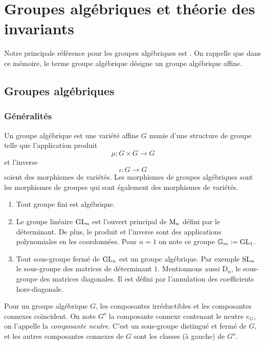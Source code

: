 \chapter{Groupes algébriques et théorie des invariants}

Notre principale référence pour les groupes algébriques est \cite{LAGSpringer}. On rappelle que dans ce mémoire, le terme groupe algébrique désigne un groupe algébrique affine.

\section{Groupes algébriques}

\subsection{Généralités}

\begin{defn}
Un groupe algébrique est une variété affine $G$ munie d'une structure de groupe telle que l'application produit
$$\mu:G\times G\rightarrow G$$
et l'inverse
$$\iota:G\rightarrow G$$
soient des morphismes de variétés. Les morphismes de groupes algébriques sont les morphismes de groupes  qui sont également des morphismes de variétés.
\end{defn}

\begin{ex}
\begin{enumerate}
\item Tout groupe fini est algébrique.
\item Le groupe linéaire $\operatorname{GL}_n$ est l'ouvert principal de $\operatorname{M}_n$ défini par le déterminant. De plus, le produit et l'inverse sont des applications polynomiales en les coordonnées. Pour $n=1$ on note ce groupe $\mathbb{G}_m:=\operatorname{GL}_1$.
\item Tout sous-groupe fermé de $\operatorname{GL}_n$ est un groupe algébrique. Par exemple $\operatorname{SL}_n$ le sous-groupe des matrices de déterminant $1$. Mentionnons aussi D$_n$, le sous-groupe des matrices diagonales. Il est défini par l'annulation des coefficients hors-diagonale.
\end{enumerate}
\end{ex}

Pour un groupe algébrique $G$, les composantes irréductibles et les composantes connexes coïncident. On note $G^o$ la composante connexe contenant le neutre $e_G$, on l'appelle la \textit{composante neutre}. C'est un sous-groupe distingué et fermé de $G$, et les autres composantes connexes de $G$ sont les classes (à gauche) de $G^o$.

